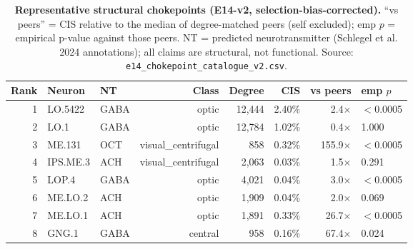 \begin{table}[htbp]
\centering
\small
\caption{\textbf{Representative structural chokepoints (E14-v2, selection-bias-corrected).} ``vs peers'' = CIS relative to the median of degree-matched peers (self excluded); emp $p$ = empirical p-value against those peers. NT = predicted neurotransmitter (Schlegel et al. 2024 annotations); all claims are structural, not functional. Source: \texttt{e14\_chokepoint\_catalogue\_v2.csv}.}\label{tab:chokepoints}
\begin{tabular}{rllrrrrl}
\hline
Rank & Neuron & NT & Class & Degree & CIS & vs peers & emp $p$ \\
\hline
1 & LO.5422 & GABA & optic & 12,444 & 2.40\% & 2.4$\times$ & $<$0.0005 \\
2 & LO.1 & GABA & optic & 12,784 & 1.02\% & 0.4$\times$ & 1.000 \\
3 & ME.131 & OCT & visual\_centrifugal & 858 & 0.32\% & 155.9$\times$ & $<$0.0005 \\
4 & IPS.ME.3 & ACH & visual\_centrifugal & 2,063 & 0.03\% & 1.5$\times$ & 0.291 \\
5 & LOP.4 & GABA & optic & 4,021 & 0.04\% & 3.0$\times$ & $<$0.0005 \\
6 & ME.LO.2 & ACH & optic & 1,909 & 0.04\% & 2.0$\times$ & 0.069 \\
7 & ME.LO.1 & ACH & optic & 1,891 & 0.33\% & 26.7$\times$ & $<$0.0005 \\
8 & GNG.1 & GABA & central & 958 & 0.16\% & 67.4$\times$ & 0.024 \\
\hline
\end{tabular}
\end{table}
